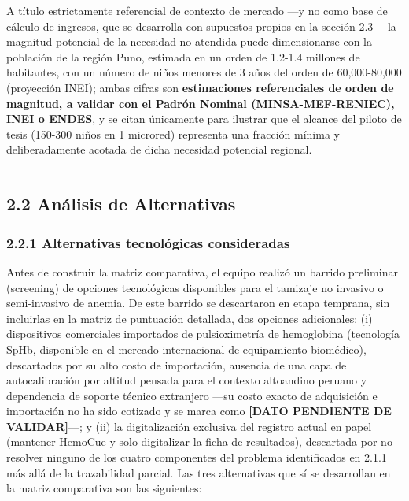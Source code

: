 \documentclass[11pt,a4paper]{article}
\begin{document}
A título estrictamente referencial de contexto de mercado ---y no como base de cálculo de ingresos, que se desarrolla con supuestos propios en la sección 2.3--- la magnitud potencial de la necesidad no atendida puede dimensionarse con la población de la región Puno, estimada en un orden de 1.2-1.4 millones de habitantes, con un número de niños menores de 3 años del orden de 60,000-80,000 (proyección INEI); ambas cifras son \textbf{estimaciones referenciales de orden de magnitud, a validar con el Padrón Nominal (MINSA-MEF-RENIEC), INEI o ENDES}, y se citan únicamente para ilustrar que el alcance del piloto de tesis (150-300 niños en 1 microred) representa una fracción mínima y deliberadamente acotada de dicha necesidad potencial regional.

\begin{center}\rule{0.5\linewidth}{0.5pt}\end{center}

\subsection{2.2 Análisis de Alternativas}\label{anuxe1lisis-de-alternativas}

\subsubsection{2.2.1 Alternativas tecnológicas consideradas}\label{alternativas-tecnoluxf3gicas-consideradas}

Antes de construir la matriz comparativa, el equipo realizó un barrido preliminar (screening) de opciones tecnológicas disponibles para el tamizaje no invasivo o semi-invasivo de anemia. De este barrido se descartaron en etapa temprana, sin incluirlas en la matriz de puntuación detallada, dos opciones adicionales: (i) dispositivos comerciales importados de pulsioximetría de hemoglobina (tecnología SpHb, disponible en el mercado internacional de equipamiento biomédico), descartados por su alto costo de importación, ausencia de una capa de autocalibración por altitud pensada para el contexto altoandino peruano y dependencia de soporte técnico extranjero ---su costo exacto de adquisición e importación no ha sido cotizado y se marca como \textbf{{[}DATO PENDIENTE DE VALIDAR{]}}---; y (ii) la digitalización exclusiva del registro actual en papel (mantener HemoCue y solo digitalizar la ficha de resultados), descartada por no resolver ninguno de los cuatro componentes del problema identificados en 2.1.1 más allá de la trazabilidad parcial. Las tres alternativas que sí se desarrollan en la matriz comparativa son las siguientes:
\end{document}
